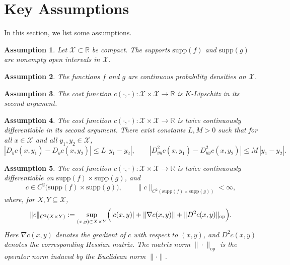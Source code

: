 \documentclass[12pt,leqno]{amsart}
\newtheorem{assumption}{Assumption}
\begin{document}
\section{Key Assumptions}\label{subsec:assume}
In this section, we list some assumptions. 

\begin{assumption}\label{ass:domain-support}
Let $\mathcal{X}\subset \mathbb R$ be compact. The supports $\mathrm{supp}(f)$ and $\mathrm{supp}(g)$ are nonempty open intervals in $\mathcal{X}$.
\end{assumption}

\begin{assumption}\label{ass:density-cont}
The functions $f$ and $g$ are continuous probability densities on $\mathcal{X}$.
\end{assumption}

\begin{assumption}\label{ass:cost-lipschitz}
The cost function $c(\cdot,\cdot):\mathcal{X} \times\mathcal{X}\rightarrow\mathbb R$ is $K$-Lipschitz in its second argument.
\end{assumption} 

\begin{assumption}\label{ass:cost-second}
The cost function $c(\cdot,\cdot):\mathcal{X}\times\mathcal{X}\to\mathbb R$ is twice continuously differentiable in its second argument.
There exist constants $L,M>0$ such that for all $x\in\mathcal{X}$ and all $y_1,y_2\in\mathcal{X}$,
\[
|D_y c(x,y_1)-D_y c(x,y_2)|\le L\,|y_1-y_2|, \qquad |D^2_{yy}c(x,y_1)-D^2_{yy}c(x,y_2)|\le M\,|y_1-y_2|.
\]
\end{assumption}


\begin{assumption}\label{ass:philippis-C2}
The cost function  $c(\cdot,\cdot):\mathcal{X} \times\mathcal{X}\rightarrow\mathbb R$ is twice continuously differentiable on
$\mathrm{supp}(f)\times \mathrm{supp}(g)$, and
\[
c \in C^2\!\big(\mathrm{supp}(f)\times \mathrm{supp}(g)\big), \qquad \|c\|_{C^2(\mathrm{supp}(f)\times \mathrm{supp}(g))}<\infty,
\]
where, for $X,Y\subseteq \mathcal{X}$,
\[
\|c\|_{C^2(X\times Y)} :=\sup_{(x,y)\in X\times Y}\Bigl( |c(x,y)| +\|\nabla c(x,y)\| +\|D^2 c(x,y)\|_{\mathrm{op}} \Bigr).
\]
Here $\nabla c(x,y)$ denotes the gradient of $c$ with respect to $(x,y)$, and
$D^2 c(x,y)$ denotes the corresponding Hessian matrix. The matrix norm $\|\cdot\|_{\mathrm{op}}$ is the operator norm induced by the Euclidean norm $\|\cdot\|$.
\end{assumption}
\end{document}

